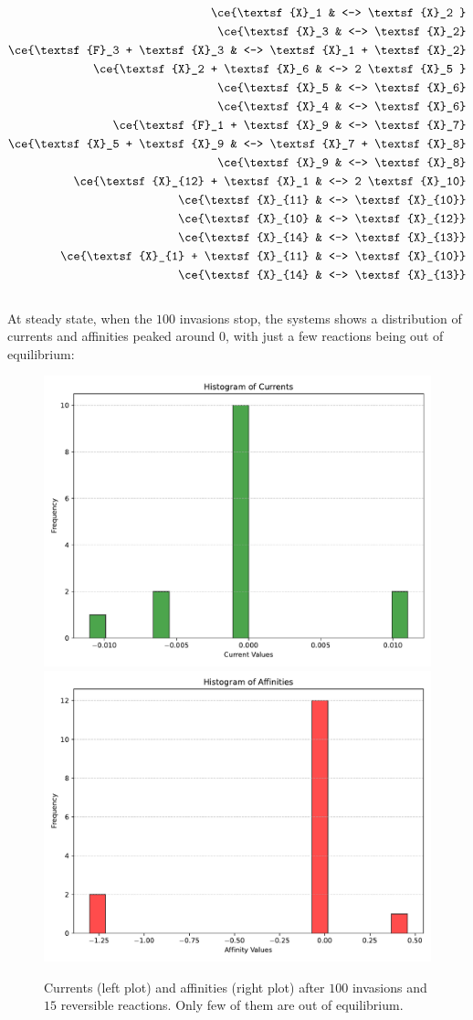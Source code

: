 \documentclass{article}
\begin{document}
\begin{equation}
		\begin{split}
\ce{\textsf{X}_1 & <--> \textsf{X}_2 }\\ 
\ce{\textsf{X}_3 & <--> \textsf{X}_2}\\ 
\ce{\textsf{F}_3 + \textsf{X}_3 & <--> \textsf{X}_1 + \textsf{X}_2}\\ 
\ce{\textsf{X}_2 + \textsf{X}_6 & <--> 2 \textsf{X}_5 }\\ 
\ce{\textsf{X}_5 & <--> \textsf{X}_6}\\ 
\ce{\textsf{X}_4 & <--> \textsf{X}_6}\\ 
\ce{\textsf{F}_1 + \textsf{X}_9 & <--> \textsf{X}_7}\\ 
\ce{\textsf{X}_5 + \textsf{X}_9 & <--> \textsf{X}_7 + \textsf{X}_8}\\ 
\ce{\textsf{X}_9 & <--> \textsf{X}_8}\\ 
\ce{\textsf{X}_{12} + \textsf{X}_1 & <--> 2 \textsf{X}_10}\\ 
\ce{\textsf{X}_{11} & <--> \textsf{X}_{10}}\\ 
\ce{\textsf{X}_{10} & <--> \textsf{X}_{12}}\\ 
\ce{\textsf{X}_{14} & <--> \textsf{X}_{13}}\\ 
\ce{\textsf{X}_{1} + \textsf{X}_{11} & <--> \textsf{X}_{10}}\\ 
\ce{\textsf{X}_{14} & <--> \textsf{X}_{13}}\\  
\end{split} 
\end{equation}
\\

At steady state, when the $100$ invasions stop, the systems shows a distribution of currents and affinities peaked around $0$, with just a few reactions being out of equilibrium:

\begin{figure}[H]
    \centering
    \includegraphics[width=0.45\linewidth]{Currents.pdf}
    \includegraphics[width=0.45\linewidth]{Affinities.pdf} 
    \caption{\small{Currents (left plot) and affinities (right plot) after $100$ invasions and $15$ reversible reactions. Only few of them are out of equilibrium. }}
    \label{Fig. 12}
\end{figure}
\end{document}
